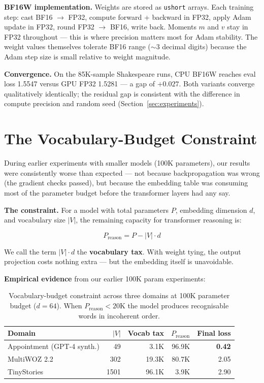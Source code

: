 \documentclass[11pt]{article}
\begin{document}
\textbf{BF16W implementation.} Weights are stored as \texttt{ushort} arrays.
Each training step: cast BF16 $\to$ FP32, compute forward + backward in FP32,
apply Adam update in FP32, round FP32 $\to$ BF16, write back.
Moments $m$ and $v$ stay in FP32 throughout --- this is where precision matters most
for Adam stability. The weight values themselves tolerate BF16 range ($\sim$3 decimal
digits) because the Adam step size is small relative to weight magnitude.

\textbf{Convergence.} On the 85K-sample Shakespeare runs, CPU BF16W
reaches eval loss 1.5547 versus GPU FP32 1.5281 --- a gap of $+0.027$.
Both variants converge qualitatively identically; the residual gap is consistent
with the difference in compute precision and random seed (Section~\ref{sec:experiments}).

\section{The Vocabulary-Budget Constraint}

\label{sec:vocab}

During earlier experiments with smaller models (100K parameters), our results were
consistently worse than expected --- not because backpropagation was wrong (the
gradient checks passed), but because the embedding table was consuming most of the
parameter budget before the transformer layers had any say.

\textbf{The constraint.} For a model with total parameters $P$, embedding dimension
$d$, and vocabulary size $|V|$, the remaining capacity for transformer reasoning is:

\begin{equation}
P_{\text{reason}} = P - |V| \cdot d
\label{eq:vocab-budget}
\end{equation}

We call the term $|V| \cdot d$ the \textbf{vocabulary tax}. With weight tying, the
output projection costs nothing extra --- but the embedding itself is unavoidable.

\textbf{Empirical evidence} from our earlier 100K param experiments:

\begin{table}[ht]
\centering
\begin{tabular}{lrrrr}
\toprule
Domain & $|V|$ & Vocab tax & $P_\text{reason}$ & Final loss \\
\midrule
Appointment (GPT-4 synth.) & 49   & 3.1K  & 96.9K & \textbf{0.42} \\
MultiWOZ 2.2               & 302  & 19.3K & 80.7K & 2.05 \\
TinyStories                & 1501 & 96.1K & 3.9K  & 2.90 \\
\bottomrule
\end{tabular}
\caption{Vocabulary-budget constraint across three domains at 100K parameter budget
($d{=}64$). When $P_\text{reason} < 20$K the model produces recognisable words in
incoherent order.}
\label{tab:vocab-budget}
\end{table}
\end{document}
